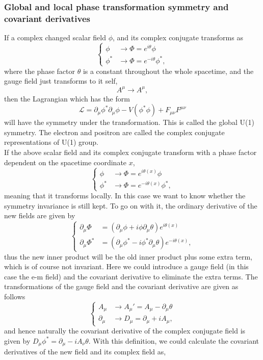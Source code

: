 \documentclass{article}
\newcommand{\be}{\begin{equation}}
\newcommand{\ee}{\end{equation}}
\newcommand{\p}{\partial}
\renewcommand{\1}{\left}
\renewcommand{\2}{\right}
\newcommand{\ma}{\mathcal}
\newcommand{\m}{\mu}
\newcommand{\n}{\nu}
\renewcommand{\th}{\theta}
\begin{document}
\subsubsection{Global and local phase transformation symmetry and covariant derivatives}
If a complex changed scalar field $\phi$, and its complex conjugate transforms as
\be\1\{\begin{split}
\phi &\rightarrow \Phi=e^{i\th} \phi\\
\phi^* &\rightarrow \Phi=e^{-i\th} \phi^*,
\end{split}\2.\ee
where the phase factor $\th$ is a constant throughout the whole spacetime, and the gauge field just transforms to it self,
\be
A^\m \rightarrow A^\m,
\ee
then the Lagrangian which has the form 
\be \ma L=\p_\m \phi^*\p_\m \phi-V(\phi^*\phi)+F_{\m\n}F^{\m\n} \ee
will have the symmetry under the transformation. This is called the global U(1) symmetry. The electron and positron are called the complex conjugate representations of U(1) group.\\
If the above scalar field and its complex conjugate transform with a phase factor dependent on the spacetime coordinate $x$,
\be\1\{\begin{split}
\phi &\rightarrow \Phi=e^{i\th(x)} \phi\\
\phi^* &\rightarrow \Phi=e^{-i\th(x)} \phi^*,
\end{split}\2.\ee
meaning that it transforms locally. In this case we want to know whether the symmetry invariance is still kept. To go on with it, the ordinary derivative of the new fields are given by
\be\1\{\begin{split}
\p_\m\Phi&=\1(\p_\m\phi+i\phi\p_\m\th\2)e^{i\th(x)} \\
\p_\m\Phi^*&=\1(\p_\m\phi^*-i\phi^*\p_\m\th\2)e^{-i\th(x)},
\end{split}\2.\ee
thus the new inner product will be the old inner product plus some extra term, which is of course not invariant. Here we could introduce a gauge field (in this case the e-m field) and the covariant derivative to eliminate the extra terms. The transformations of the gauge field and the covariant derivative are given as follows
\be\1\{\begin{split}
A_\m&\rightarrow A_\m'=A_\m-\p_\m\th \\
\p_\m&\rightarrow D_\m =\p_\m+iA_\m,
\end{split}\2.\ee
and hence naturally the covariant derivative of the complex conjugate field is given by $D_\m\phi^*=\p_\m-iA_\n\th$. With this definition, we could calculate the covariant derivatives of the new field and its complex field as,
\end{document}
